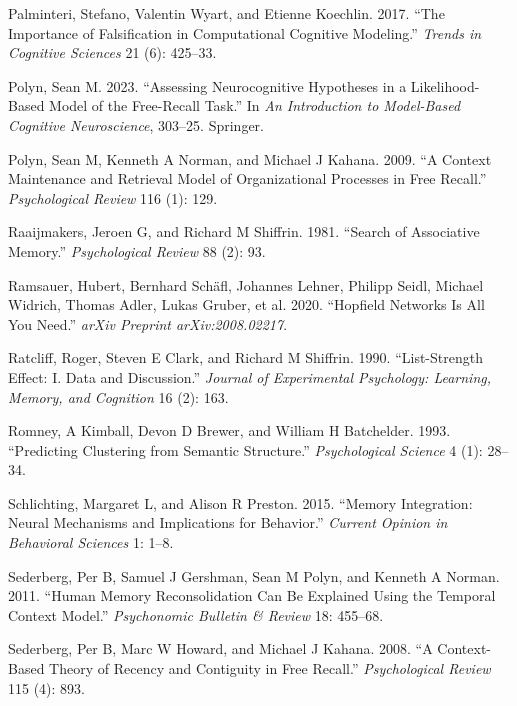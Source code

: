 \documentclass[
  letterpaper,
  11pt,
  english,
  singlespacing,
  headsepline]{MastersDoctoralThesis}
\newlength{\cslhangindent}
\newenvironment{CSLReferences}[2] %
 {\begin{list}{}{%
  \setlength{\itemindent}{0pt}
  \setlength{\leftmargin}{0pt}
  \setlength{\parsep}{0pt}
  \ifodd #1
   \setlength{\leftmargin}{\cslhangindent}
   \setlength{\itemindent}{-1\cslhangindent}
  \fi
  \setlength{\itemsep}{#2\baselineskip}}}
 {\end{list}}
\begin{document}
\begin{CSLReferences}{1}{0}
Palminteri, Stefano, Valentin Wyart, and Etienne Koechlin. 2017. {``The
Importance of Falsification in Computational Cognitive Modeling.''}
\emph{Trends in Cognitive Sciences} 21 (6): 425--33.

Polyn, Sean M. 2023. {``Assessing Neurocognitive Hypotheses in a
Likelihood-Based Model of the Free-Recall Task.''} In \emph{An
Introduction to Model-Based Cognitive Neuroscience}, 303--25. Springer.

Polyn, Sean M, Kenneth A Norman, and Michael J Kahana. 2009. {``A
Context Maintenance and Retrieval Model of Organizational Processes in
Free Recall.''} \emph{Psychological Review} 116 (1): 129.

Raaijmakers, Jeroen G, and Richard M Shiffrin. 1981. {``Search of
Associative Memory.''} \emph{Psychological Review} 88 (2): 93.

Ramsauer, Hubert, Bernhard Schäfl, Johannes Lehner, Philipp Seidl,
Michael Widrich, Thomas Adler, Lukas Gruber, et al. 2020. {``Hopfield
Networks Is All You Need.''} \emph{arXiv Preprint arXiv:2008.02217}.

Ratcliff, Roger, Steven E Clark, and Richard M Shiffrin. 1990.
{``List-Strength Effect: I. Data and Discussion.''} \emph{Journal of
Experimental Psychology: Learning, Memory, and Cognition} 16 (2): 163.

Romney, A Kimball, Devon D Brewer, and William H Batchelder. 1993.
{``Predicting Clustering from Semantic Structure.''} \emph{Psychological
Science} 4 (1): 28--34.

Schlichting, Margaret L, and Alison R Preston. 2015. {``Memory
Integration: Neural Mechanisms and Implications for Behavior.''}
\emph{Current Opinion in Behavioral Sciences} 1: 1--8.

Sederberg, Per B, Samuel J Gershman, Sean M Polyn, and Kenneth A Norman.
2011. {``Human Memory Reconsolidation Can Be Explained Using the
Temporal Context Model.''} \emph{Psychonomic Bulletin \& Review} 18:
455--68.

Sederberg, Per B, Marc W Howard, and Michael J Kahana. 2008. {``A
Context-Based Theory of Recency and Contiguity in Free Recall.''}
\emph{Psychological Review} 115 (4): 893.


\end{CSLReferences}
\end{document}
